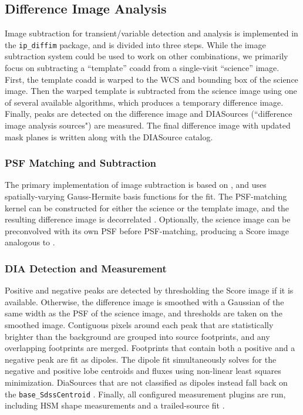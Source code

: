 \subsection{Difference Image Analysis}
\label{sec:dia}

Image subtraction for transient/variable detection and analysis is implemented in the \texttt{ip\_diffim} package, and is divided into three steps.
While the image subtraction system could be used to work on other combinations, we primarily focus on subtracting a ``template'' coadd from a single-visit ``science'' image.
First, the template coadd is warped to the WCS and bounding box of the science image.
Then the warped template is subtracted from the science image using one of several available algorithms, which produces a temporary difference image.
Finally, peaks are detected on the difference image and DIASources (``difference image analysis sources") are measured.
The final difference image with updated mask planes is written along with the DIASource catalog.

\subsubsection{PSF Matching and Subtraction}

The primary implementation of image subtraction is based on \citet{1998ApJ...503..325A}, and uses spatially-varying Gauss-Hermite basis functions for the fit.
The PSF-matching kernel can be constructed for either the science or the template image, and the resulting difference image is decorrelated \citet{DMTN-021}.
Optionally, the science image can be preconvolved with its own PSF before PSF-matching, producing a Score image analogous to \citet{2016ApJ...830...27Z}.

\subsubsection{DIA Detection and Measurement}
\label{sec:detectAndMeasureDiaSource}

Positive and negative peaks are detected by thresholding the Score image if it is available.
Otherwise, the difference image is smoothed with a Gaussian of the same width as the PSF of the science image, and thresholds are taken on the smoothed image.
Contiguous pixels around each peak that are statistically brighter than the background are grouped into source footprints, and any overlapping footprints are merged.
Footprints that contain both a positive and a negative peak are fit as dipoles.
The dipole fit simultaneously solves for the negative and positive lobe centroids and fluxes using non-linear least squares minimization.
DiaSources that are not classified as dipoles instead fall back on the \texttt{base\_SdssCentroid} .
Finally, all configured measurement plugins are run, including HSM shape measurements  and a trailed-source fit .

